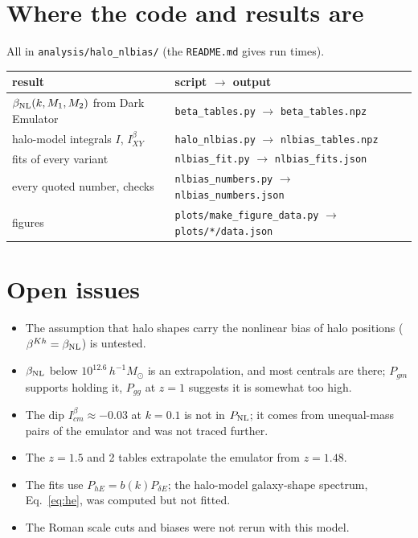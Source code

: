 \documentclass[11pt]{article}
\newcommand{\Msun}{\,h^{-1}M_\odot}
\newcommand{\PNL}{P_{\rm NL}}
\newcommand{\bNL}{\beta_{\rm NL}}
\newcommand{\Ib}[1]{I^{\beta}_{#1}}
\begin{document}
\section{Where the code and results are}
\label{app:code}

All in \texttt{analysis/halo\_nlbias/} (the \texttt{README.md} gives run times).

\begin{center}\small
  \begin{tabular}{ll}
    \toprule
    result & script $\rightarrow$ output \\
    \midrule
    $\bNL(k, M_1, M_2)$ from Dark Emulator & \texttt{beta\_tables.py} $\rightarrow$ \texttt{beta\_tables.npz} \\
    halo-model integrals $I$, $\Ib{XY}$ & \texttt{halo\_nlbias.py} $\rightarrow$ \texttt{nlbias\_tables.npz} \\
    fits of every variant & \texttt{nlbias\_fit.py} $\rightarrow$ \texttt{nlbias\_fits.json} \\
    every quoted number, checks & \texttt{nlbias\_numbers.py} $\rightarrow$ \texttt{nlbias\_numbers.json} \\
    figures & \texttt{plots/make\_figure\_data.py} $\rightarrow$ \texttt{plots/*/data.json} \\
    \bottomrule
  \end{tabular}
\end{center}

\section{Open issues}
\label{app:open}

\begin{itemize}[itemsep=1pt,topsep=2pt]
  \item The assumption that halo shapes carry the nonlinear bias of halo
    positions ($\beta^{Kh} = \bNL$) is untested.
  \item $\bNL$ below $10^{12.6}\Msun$ is an extrapolation, and most centrals
    are there; $P_{gm}$ supports holding it, $P_{gg}$ at $z = 1$ suggests it
    is somewhat too high.
  \item The dip $\Ib{cm} \approx -0.03$ at $k = 0.1$ is not in $\PNL$; it comes
    from unequal-mass pairs of the emulator and was not traced further.
  \item The $z = 1.5$ and 2 tables extrapolate the emulator from $z = 1.48$.
  \item The fits use $P_{hE} = b(k)P_{\delta E}$; the halo-model galaxy-shape
    spectrum, Eq.~\eqref{eq:he}, was computed but not fitted.
  \item The Roman scale cuts and biases were not rerun with this model.
\end{itemize}
\end{document}
